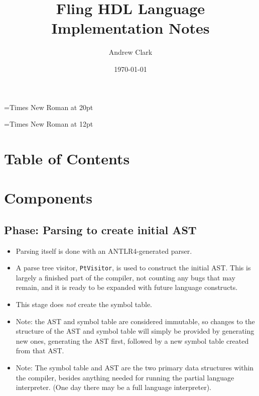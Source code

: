 \documentclass{article}
\makeatletter
\renewcommand\tableofcontents{%
    \@starttoc{toc}%
}
\makeatother
\begin{document}
	\font\titlefont={Times New Roman} at 20pt
	\title{{\titlefont Fling HDL Language Implementation Notes }}

	\font\bottomtextfont={Times New Roman} at 12pt
	\date{{\bottomtextfont} \today}
	\author{{\bottomtextfont Andrew Clark}}

	\setmainfont{Times New Roman}
	\setmonofont{Courier New}

	\maketitle

	\newpage

	\doublespacing


\section{Table of Contents}
	\tableofcontents
	\newpage

\section{Components}
	\subsection{Phase:  Parsing to create initial AST}
		\begin{itemize}
		\item Parsing itself is done with an ANTLR4-generated parser.
		\item A parse tree visitor, \texttt{PtVisitor}, is used to
			construct the initial AST.  This is largely a finished part of
			the compiler, not counting any bugs that may remain, and it is
			ready to be expanded with future language constructs.
		\item This stage does \textit{not} create the symbol table.
		\item Note:  the AST and symbol table are considered immutable, so
			changes to the structure of the AST and symbol table will
			simply be provided by generating new ones, generating the AST
			first, followed by a new symbol table created from that AST.
		\item Note:  The symbol table and AST are the two primary data
			structures within the compiler, besides anything needed for
			running the partial language interpreter.  (One day there may
			be a full language interpreter).
		\end{itemize}
\end{document}
